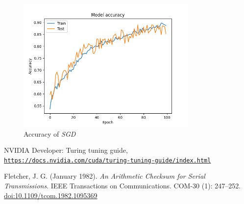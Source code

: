 \documentclass[compsoc]{IEEEtran}
\begin{document}
\begin{figure}[ht!]
\centering                                                                        
\includegraphics[width=3.5in]{../images/accuracy-4000-6-binary_crossentropy-sgd-100-4.png}
\captionsetup{justification=centering}                                                                                                                                   
\caption{Accuracy of \emph{SGD}}
\label{fig:s2}
\end{figure}







\begin{thebibliography}{9}

NVIDIA Developer: Turing tuning guide,
\\\texttt{\href{https://docs.nvidia.com/cuda/turing-tuning-guide/index.html}{https://docs.nvidia.com/cuda/turing-tuning-guide/index.html}}


Fletcher, J. G. (January 1982). \textit{An Arithmetic Checksum for Serial Transmissions}. IEEE Transactions on Communications. COM-30 (1): 247–252. 
\href{https://ieeexplore.ieee.org/document/1095369}{doi:10.1109/tcom.1982.1095369}
\end{thebibliography}
\end{document}
